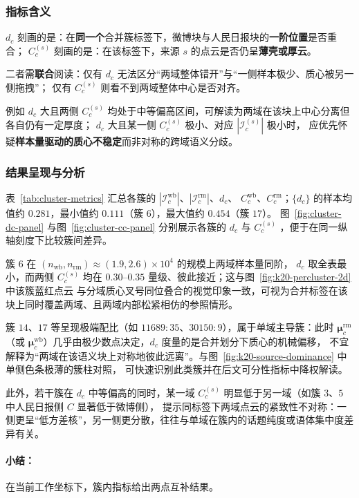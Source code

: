 \documentclass[withoutpreface]{cumcmthesis}
\begin{document}
\subsubsection{指标含义}
$d_c$ 刻画的是：在\textbf{同一个}合并簇标签下，微博块与人民日报块的\textbf{一阶位置}是否重合；
$C_c^{(s)}$ 刻画的是：在该标签下，来源 $s$ 的点云是否仍呈\textbf{薄壳或厚云}。

二者需\textbf{联合}阅读：仅有 $d_c$ 无法区分“两域整体错开”与“一侧样本极少、质心被另一侧拖拽”；
仅有 $C_c^{(s)}$ 则看不到两域整体中心是否对齐。

例如 $d_c$ 大且两侧 $C_c^{(s)}$ 均处于中等偏高区间，可解读为两域在该块上中心分离但各自仍有一定厚度；
$d_c$ 大且某一侧 $C_c^{(s)}$ 极小、对应 $|\mathcal{I}^{(s)}_c|$ 极小时，
应优先怀疑\textbf{样本量驱动的质心不稳定}而非对称的跨域语义分歧。

\subsubsection{结果呈现与分析}
表~\ref{tab:cluster-metrics} 汇总各簇的 $|\mathcal{I}^{\mathrm{wb}}_c|$、$|\mathcal{I}^{\mathrm{rm}}_c|$、$d_c$、
$C_c^{\mathrm{wb}}$、$C_c^{\mathrm{rm}}$；$\{d_c\}$ 的样本均值约 $0.281$，最小值约 $0.111$（簇 $6$），最大值约 $0.454$（簇 $17$）。
图~\ref{fig:cluster-dc-panel} 与图~\ref{fig:cluster-cc-panel} 分别展示各簇的 $d_c$ 与 $C_c^{(s)}$ ，便于在同一纵轴刻度下比较簇间差异。

簇 $6$ 在 $(n_{\mathrm{wb}},n_{\mathrm{rm}})\approx(1.9,2.6)\times 10^4$ 的规模上两域样本量同阶，
$d_c$ 取全表最小，而两侧 $C_c^{(s)}$ 均在 $0.30$--$0.35$ 量级、彼此接近；这与图~\ref{fig:k20-percluster-2d} 中该簇蓝红点云
与分域质心叉号同位叠合的视觉印象一致，可视为合并标签在该块上同时覆盖两域、且两域内部松紧相仿的参照情形。

簇 $14$、$17$ 等呈现极端配比（如 $11689:35$、$30150:9$），属于单域主导簇：此时 $\boldsymbol{\mu}^{\mathrm{rm}}_c$
（或 $\boldsymbol{\mu}^{\mathrm{wb}}_c$）几乎由极少数点决定，$d_c$ 度量的是合并划分下质心的机械偏移，
不宜解释为“两域在该语义块上对称地彼此远离”。与图~\ref{fig:k20-source-dominance} 中单侧色条极薄的簇柱对照，
可快速识别此类簇并在后文可分性指标中降权解读。

此外，若干簇在 $d_c$ 中等偏高的同时，某一域 $C_c^{(s)}$ 明显低于另一域（如簇 $3$、$5$ 中人民日报侧 $C$ 显著低于微博侧），
提示同标签下两域点云的紧致性不对称：一侧更呈“低方差核”，另一侧更分散，往往与单域在簇内的话题纯度或语体集中度差异有关。

\paragraph{小结：} 在当前工作坐标下，簇内指标给出两点互补结果。
\end{document}
